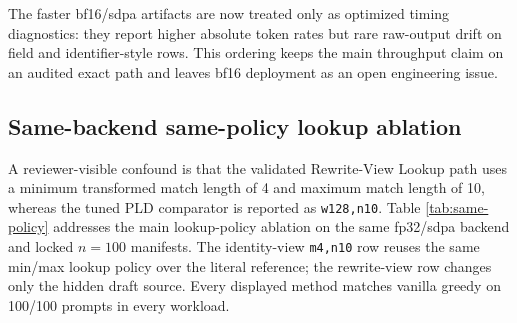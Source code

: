 \documentclass[11pt,a4paper]{article}
\begin{document}
\begin{table}[h]
\centering\scriptsize
\caption{Main exact-path controlled result: VANTAGE with the
SafeRoute scheduler on Qwen2.5-Coder-7B
controlled structured Python edit workloads under fp32/sdpa. Non-control
ratios are paired task-bootstrap comparisons against tuned PLD in the same run; both
PLD and VANTAGE/SafeRoute match vanilla greedy on 100/100 tasks in every row.
For zero drift, the measured ratio is shown only as a same-route measurement
control and its interval is suppressed; because SafeRoute dispatches to the
same PLD path and no rewrite-view index is built, this row is not used as
algorithmic speedup evidence. Bootstrap intervals measure task heterogeneity
within this single run, not run-order or GPU timing variance.}
\label{tab:frozen-headline}
\end{table}

The faster bf16/sdpa artifacts are now treated only as optimized timing
diagnostics: they report higher absolute token rates but rare raw-output
drift on field and identifier-style rows. This ordering keeps the main
throughput claim on an audited exact path and leaves bf16 deployment as an
open engineering issue.

\subsection{Same-backend same-policy lookup ablation}
\label{sec:same-policy}

A reviewer-visible confound is that the validated Rewrite-View Lookup path uses a
minimum transformed match length of 4 and maximum match length of 10, whereas
the tuned PLD comparator is reported as \texttt{w128,n10}. Table
\ref{tab:same-policy} addresses the main lookup-policy ablation on the same
fp32/sdpa backend and locked $n=100$ manifests. The identity-view
\texttt{m4,n10} row reuses the same min/max lookup policy over the literal
reference; the rewrite-view row changes only the hidden draft source.
Every displayed method matches vanilla greedy on 100/100 prompts in every
workload.
\end{document}
